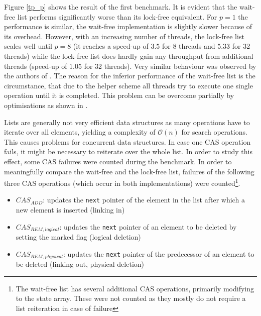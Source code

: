 \documentclass[a4paper, 12pt]{article}
\begin{document}
Figure \ref{tp_p} shows the result of the first benchmark. It is evident that the wait-free list performs significantly worse than its lock-free equivalent. For $p=1$ the performance is similar, the wait-free implementation is slightly slower because of its overhead. However, with  an increasing number of threads, the lock-free list scales well until $p=8$ (it reaches a speed-up of $3.5$ for 8 threads and $5.33$ for 32 threads) while the lock-free list does hardly gain any throughput from additional threads (speed-up of $1.05$ for 32 threads). Very similar behaviour was observed by the authors of \cite{timnat12}. The reason for the inferior performance of the wait-free list is the circumstance, that due to the helper scheme all threads try to execute one single operation until it is completed. This problem can be overcome partially by optimisations as shown in \cite{timnat12}.

Lists are generally not very efficient data structures as many operations have to iterate over all elements, yielding a complexity of $\mathcal{O}(n)$ for search operations. This causes problems for concurrent data structures. In case one CAS operation fails, it might be necessary to reiterate over the whole list. In order to study this effect, some CAS failures were counted during the benchmark. In order to meaningfully compare the wait-free and the lock-free list, failures of the following three CAS operations (which occur in both implementations) were counted\footnote{The wait-free list has several additional CAS operations, primarily modifying to the state array. These were not counted as they mostly do not require a list reiteration in case of failure}.
\begin{itemize}
\setlength\itemsep{0em}
\item{$CAS_{ADD}$: updates the \verb|next| pointer of the element in the list after which a new element is inserted (linking in)}
\item{$CAS_{REM, logical}$: updates the \verb|next| pointer of an element to be deleted by setting the marked flag (logical deletion)}
\item{$CAS_{REM, physical}$: updates the \verb|next| pointer of the predecessor of an element to be deleted (linking out, physical deletion)}
\end{itemize}
\end{document}
